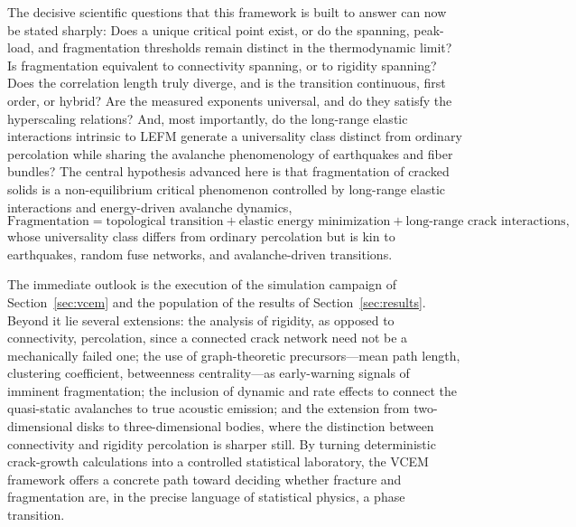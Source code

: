 \documentclass[preprint,12pt]{elsarticle}
\begin{document}
The decisive scientific questions that this framework is built to answer can now be
stated sharply: Does a unique critical point exist, or do the spanning, peak-load, and
fragmentation thresholds remain distinct in the thermodynamic limit? Is fragmentation
equivalent to connectivity spanning, or to rigidity spanning? Does the correlation
length truly diverge, and is the transition continuous, first order, or hybrid? Are
the measured exponents universal, and do they satisfy the hyperscaling relations? And,
most importantly, do the long-range elastic interactions intrinsic to LEFM generate a
universality class distinct from ordinary percolation while sharing the avalanche
phenomenology of earthquakes and fiber bundles? The central hypothesis advanced here
is that fragmentation of cracked solids is a non-equilibrium critical phenomenon
controlled by long-range elastic interactions and energy-driven avalanche dynamics,
\begin{equation}
\text{Fragmentation} = \text{topological transition} + \text{elastic energy minimization} + \text{long-range crack interactions},
\end{equation}
whose universality class differs from ordinary percolation but is kin to earthquakes,
random fuse networks, and avalanche-driven transitions.

The immediate outlook is the execution of the simulation campaign of
Section~\ref{sec:vcem} and the population of the results of
Section~\ref{sec:results}. Beyond it lie several extensions: the analysis of rigidity,
as opposed to connectivity, percolation, since a connected crack network need not be a
mechanically failed one; the use of graph-theoretic precursors---mean path length,
clustering coefficient, betweenness centrality---as early-warning signals of imminent
fragmentation; the inclusion of dynamic and rate effects to connect the quasi-static
avalanches to true acoustic emission; and the extension from two-dimensional disks to
three-dimensional bodies, where the distinction between connectivity and rigidity
percolation is sharper still. By turning deterministic crack-growth calculations into
a controlled statistical laboratory, the VCEM framework offers a concrete path toward
deciding whether fracture and fragmentation are, in the precise language of
statistical physics, a phase transition.

\newpage


\end{document}
